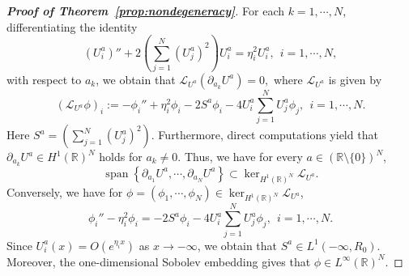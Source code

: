 \documentclass[11pt]{article}
\numberwithin{equation}{section}
\newcommand{\R}{{\mathbb{R}}}
\theoremstyle{definition}
\begin{document}
\begin{proof}[\normalfont\bfseries Proof of Theorem~\ref{prop:nondegeneracy}]
For each \(k=1,\cdots,N\), differentiating the identity
\[
(U_i^a)''
+
2\left(\sum_{j=1}^N (U_j^a)^2\right)U_i^a
=
\eta_i^2U_i^a,
\ \  i=1,\cdots,N,
\]
with respect to \(a_k\), we obtain that
\(
\mathcal L_{U^a}(\partial_{a_k}U^a)=0,
\)
where $\mathcal L_{U^a}$  is given by
\[
(\mathcal L_{U^a}\phi)_i
:=
-\phi_i''
+\eta_i^2\phi_i
-2S^a\phi_i
-4U_i^a\sum_{j=1}^N U_j^a\phi_j,
\ \  i=1,\cdots,N .
\]
Here $S^a=\left(\sum_{j=1}^N (U_j^a)^2\right)$.
Furthermore, direct computations yield that $\partial_{a_k}U^a\in H^1(\R)^N$ holds for $a_k\neq 0$. Thus, we have for every \(a\in(\mathbb R\setminus\{0\})^N\),
\[
\operatorname{span}
\left\{
\partial_{a_1}U^a,\cdots,\partial_{a_N}U^a
\right\}
\subset
\ker_{H^1(\mathbb R)^N}\mathcal L_{U^a} .
\]
Conversely, we have for
$\phi=(\phi_1,\cdots,\phi_N)
\in
\ker_{H^1(\mathbb R)^N}\mathcal L_{U^a}$,
\[
\phi_i''-\eta_i^2\phi_i
=
-2S^a\phi_i
-4U_i^a\sum_{j=1}^N U_j^a\phi_j,
\ \  i=1,\cdots,N.
\]
Since \(U_i^a(x)=O(e^{\eta_i x})\) as \(x\to-\infty\), we obtain that
\(S^a\in L^1(-\infty,R_0)\). Moreover, the one-dimensional Sobolev
embedding gives that
$\phi\in L^\infty(\mathbb R)^N$.



\end{proof}
\end{document}
